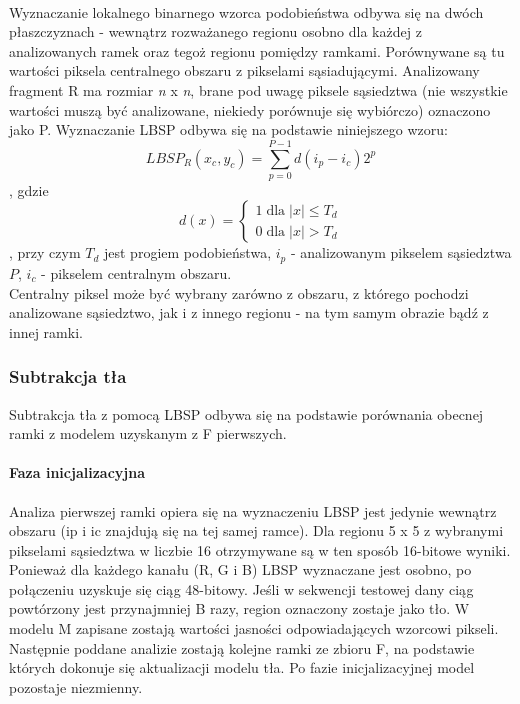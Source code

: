 \paragraph{}
Wyznaczanie lokalnego binarnego wzorca podobieństwa odbywa się na dwóch płaszczyznach - wewnątrz rozważanego regionu osobno dla każdej z analizowanych ramek oraz tegoż regionu pomiędzy ramkami. Porównywane są tu wartości piksela centralnego obszaru z pikselami sąsiadującymi. Analizowany fragment R ma rozmiar \textit{n} x \textit{n}, brane pod uwagę piksele sąsiedztwa (nie wszystkie wartości muszą być analizowane, niekiedy porównuje się wybiórczo) oznaczono jako P. Wyznaczanie LBSP odbywa się na podstawie niniejszego wzoru:
\begin{equation}
LBSP_{R}(x_{c},y_{c}) = 
\sum_{p=0}^{P-1}d(i_{p}-i_{c})2^p
\end{equation},
gdzie
\begin{equation}
d(x)=\left\{\substack{
1 \; \mathrm{dla} \; |x|\leq T_{d} \\[0.5em]
0 \; \mathrm{dla} \; |x|>T_{d}}\right.
\end{equation}
, przy czym $T_{d}$ jest progiem podobieństwa, $i_{p}$ - analizowanym pikselem sąsiedztwa $P$, $i_{c}$ - pikselem centralnym obszaru.\\
Centralny piksel może być wybrany zarówno z obszaru, z którego pochodzi analizowane sąsiedztwo, jak i z innego regionu - na tym samym obrazie bądź z innej ramki.
\subsubsection{Subtrakcja tła}
Subtrakcja tła z pomocą LBSP odbywa się na podstawie porównania obecnej ramki z modelem uzyskanym z F pierwszych. 
\paragraph{Faza inicjalizacyjna \\}
Analiza pierwszej ramki opiera się na wyznaczeniu LBSP  jest jedynie wewnątrz obszaru (ip i ic znajdują się na tej samej ramce). Dla regionu 5 x 5 z wybranymi pikselami sąsiedztwa w liczbie 16 otrzymywane są w ten sposób 16-bitowe wyniki. Ponieważ dla każdego kanału (R, G i B) LBSP wyznaczane jest osobno, po połączeniu uzyskuje się ciąg 48-bitowy. Jeśli w sekwencji testowej dany ciąg powtórzony jest przynajmniej B razy, region oznaczony zostaje jako tło. W modelu M zapisane zostają wartości jasności odpowiadających wzorcowi pikseli. Następnie poddane analizie zostają kolejne ramki ze zbioru F, na podstawie których dokonuje się aktualizacji modelu tła. Po fazie inicjalizacyjnej model pozostaje niezmienny.
